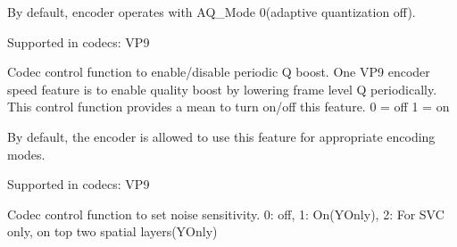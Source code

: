 \begin{Desc}
\begin{description}
By default, encoder operates with A\+Q\+\_\+\+Mode 0(adaptive quantization off).

Supported in codecs\+: V\+P9 \item[{\em 
V\+P9\+E\+\_\+\+S\+E\+T\+\_\+\+F\+R\+A\+M\+E\+\_\+\+P\+E\+R\+I\+O\+D\+I\+C\+\_\+\+B\+O\+O\+ST\hypertarget{group__vp8__encoder_gga6deae3d561c838952552c3d3756322eca064d768f60d2d60a07c160174c3df266}{}\label{group__vp8__encoder_gga6deae3d561c838952552c3d3756322eca064d768f60d2d60a07c160174c3df266}
}]Codec control function to enable/disable periodic Q boost. One V\+P9 encoder speed feature is to enable quality boost by lowering frame level Q periodically. This control function provides a mean to turn on/off this feature. 0 = off 1 = on

By default, the encoder is allowed to use this feature for appropriate encoding modes.

Supported in codecs\+: V\+P9 \item[{\em 
V\+P9\+E\+\_\+\+S\+E\+T\+\_\+\+N\+O\+I\+S\+E\+\_\+\+S\+E\+N\+S\+I\+T\+I\+V\+I\+TY\hypertarget{group__vp8__encoder_gga6deae3d561c838952552c3d3756322ecace6096a9fbe83dc72ed6a54a81ce215b}{}\label{group__vp8__encoder_gga6deae3d561c838952552c3d3756322ecace6096a9fbe83dc72ed6a54a81ce215b}
}]Codec control function to set noise sensitivity. 0\+: off, 1\+: On(\+Y\+Only), 2\+: For S\+VC only, on top two spatial layers(\+Y\+Only)


\end{description}
\end{Desc}
